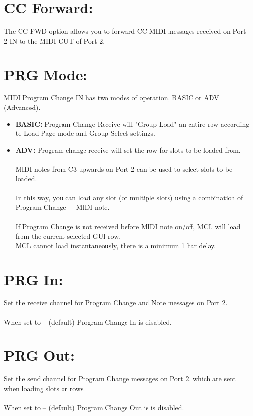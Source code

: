 \section{CC Forward:}
The CC FWD option allows you to forward CC MIDI messages received on Port 2 IN to the MIDI OUT of Port 2.
\section{PRG Mode:}
MIDI Program Change IN has two modes of operation, BASIC or ADV (Advanced).
\begin{itemize}
    \item{ \textbf{BASIC:} Program Change Receive will "Group Load" an entire row according to Load Page mode and Group Select settings. }
    \item{  \textbf{ADV:} Program change receive will set the row for slots to be loaded from.\\\\ MIDI notes from C3 upwards on Port 2 can be used to select slots to be loaded.\\\\  In this way, you can load any slot (or multiple slots) using a combination of Program Change + MIDI note. \\\\
 If Program Change is not received before MIDI note on/off, MCL will load from the current selected GUI row. }
 \\
 MCL cannot load instantaneously, there is a minimum 1 bar delay.
\end{itemize}
\section{PRG In:}
Set the receive channel for Program Change and Note messages on Port 2.\\\\
When set to -- (default) Program Change In is disabled.
\section{PRG Out:}
Set the send channel for Program Change messages on Port 2, which are sent when loading slots or rows.\\\\
When set to -- (default) Program Change Out is is disabled.